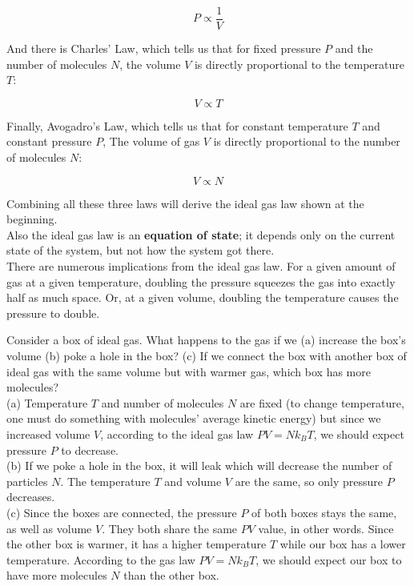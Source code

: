 $$P \propto \frac{1}{V}$$

And there is Charles' Law, which tells us that for fixed pressure $P$ and the number of molecules $N$, the volume $V$ is directly proportional to the temperature $T$:

$$V \propto T$$

Finally,  Avogadro's Law, which tells us that for constant temperature $T$ and constant pressure $P$, The volume of gas $V$ is directly proportional to the number of molecules $N$:

$$V \propto N$$

Combining all these three laws will derive the ideal gas law shown at the beginning. \\

Also the ideal gas law is an \textbf{equation of state}; it depends only on the current state of the system, but not how the system got there. \\

There are numerous implications from the ideal gas law. For a given amount of gas at a given temperature, doubling the pressure squeezes the gas into exactly half as much space. Or, at a given volume, doubling the temperature causes the pressure to double.

\begin{texample}
	Consider a box of ideal gas. What happens to the gas if we (a) increase the box's volume (b) poke a hole in the box? (c) If we connect the box with another box of ideal gas with the same volume but with warmer gas, which box has more molecules? \\
	
	(a) Temperature $T$ and number of molecules $N$ are fixed (to change temperature, one must do something with molecules' average kinetic energy) but since we increased volume $V$, according to the ideal gas law $PV=Nk_B T$, we should expect pressure $P$ to decrease. \\
	
	(b) If we poke a hole in the box, it will leak which will decrease the number of particles $N$. The temperature $T$ and volume $V$ are the same, so only pressure $P$ decreases. \\
	
	(c) Since the boxes are connected, the pressure $P$ of both boxes stays the same, as well as volume $V$. They both share the same $PV$ value, in other words. Since the other box is warmer, it has a higher temperature $T$ while our box has a lower temperature. According to the gas law $PV=Nk_B T$, we should expect our box to have more molecules $N$ than the other box.
\end{texample}


